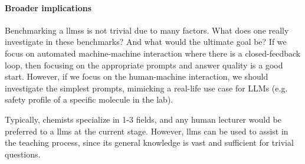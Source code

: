 \paragraph*{Broader implications}

Benchmarking a \glspl{llm}s is not trivial due to many factors.
What does one really investigate in these benchmarks? And what would the ultimate goal be?
If we focus on automated machine-machine interaction where there is a closed-feedback loop,
then focusing on the appropriate prompts and answer quality is a good start. However, if we focus on
the human-machine interaction, we should investigate the simplest prompts, mimicking a real-life use case
for LLMs (e.g. safety profile of a specific molecule in the lab).

Typically, chemists specialize in 1-3 fields, and any human lecturer would be preferred to a \glspl{llm}
at the current stage. However, \glspl{llm} can be used to assist in the teaching process, since its general 
knowledge is vast and sufficient for trivial questions.